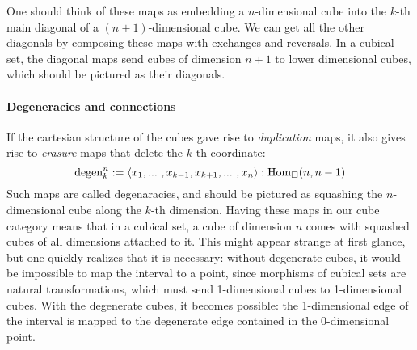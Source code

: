 % 
One should think of these maps as embedding a \( n \)-dimensional cube
into the \( k \)-th main diagonal of a \( (n+1) \)-dimensional cube. 
We can get all the other diagonals by composing these maps with exchanges
and reversals.
% 
In a cubical set, the diagonal maps send cubes of dimension \( n+1 \) to
lower dimensional cubes, which should be pictured as their diagonals.
% 
\paragraph{Degeneracies and connections}
% 
If the cartesian structure of the cubes gave rise to \emph{duplication} maps,
it also gives rise to \emph{erasure} maps that delete the \( k \)-th 
coordinate: 
\[
\mathrm{degen}_k^n := \langle x_1 , ...\ , x_{k-1} , x_{k+1} , ...\ , x_n \rangle : \hom[\catCube]{n}{n-1}
\]
Such maps are called degenaracies, and should be pictured as squashing the
\( n \)-dimensional cube along the \( k \)-th dimension. Having these maps in
our cube category means that in a cubical set, a cube of dimension \( n \) 
comes with squashed cubes of all dimensions attached to it.
% 
This might appear strange at first glance, but one quickly realizes that it is
necessary: without degenerate cubes, it would be impossible to map the interval
to a point, since morphisms of cubical sets are natural transformations, which
must send 1-dimensional cubes to 1-dimensional cubes.
% 
With the degenerate cubes, it becomes possible: the 1-dimensional edge of the
interval is mapped to the degenerate edge contained in the 0-dimensional point.

